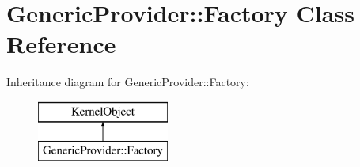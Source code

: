\hypertarget{class_generic_provider_1_1_factory}{}\section{Generic\+Provider\+:\+:Factory Class Reference}
\label{class_generic_provider_1_1_factory}
Inheritance diagram for Generic\+Provider\+:\+:Factory\+:\begin{figure}[H]
\begin{center}
\leavevmode
\includegraphics[height=2.000000cm]{class_generic_provider_1_1_factory}
\end{center}
\end{figure}

